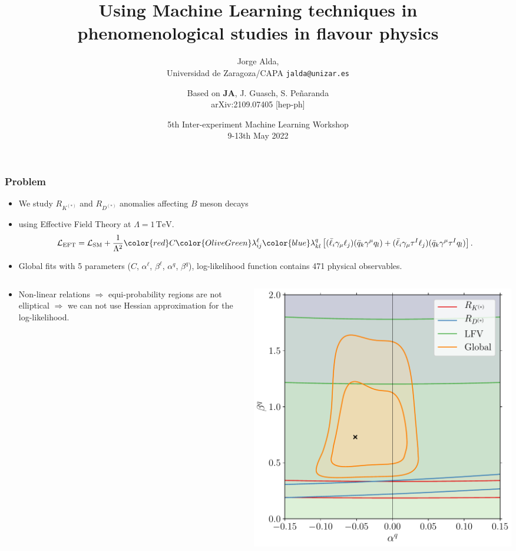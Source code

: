 \documentclass[mathserif, 10pt, dvipsnames]{beamer}
\title[Using ML techniques in phenomenological studies in flavour physics]{Using Machine Learning techniques in\\ phenomenological studies in flavour physics}
\subtitle{Jorge Alda,\\ Universidad de Zaragoza/CAPA \hspace{4em} \texttt{jalda@unizar.es} }
\author[Jorge Alda]{Based on \textbf{JA}, J. Guasch, S. Peñaranda \\
arXiv:2109.07405 [hep-ph]}
\date[CERN Workshop]{5th Inter-experiment Machine Learning Workshop\\ 9-13th May 2022}
\begin{document}
\begin{frame}

\titlepage

\end{frame}

\begin{frame}\frametitle{Problem}
\begin{itemize}
\item We study $R_{K^{(*)}}$ and $R_{D^{(*)}}$ anomalies affecting $B$ meson decays
    \item using Effective Field Theory at $\Lambda = 1\,\mathrm{TeV}$.
$$\mathcal{L}_\mathrm{EFT} = \mathcal{L}_\mathrm{SM} + \frac{1}{\Lambda^2} {\color{red}C} {\color{OliveGreen}\lambda^\ell_{ij}} {\color{blue}\lambda^q_{kl}}\left[ (\bar{\ell}_i \gamma_\mu \ell_j)(\bar{q}_k \gamma^\mu  q_l) + (\bar{\ell}_i \gamma_\mu \tau^I \ell_j)(\bar{q}_k \gamma^\mu \tau^I q_l) \right].$$
\item Global fits with 5 parameters ({\color{red}$C$}, {\color{OliveGreen}$\alpha^\ell$}, {\color{OliveGreen}$\beta^\ell$}, {\color{blue}$\alpha^q$}, {\color{blue}$\beta^q$}), log-likelihood function contains 471 physical observables.
\end{itemize}
\begin{columns}[onlytextwidth]
    \begin{column}{0.7\textwidth}
        \begin{itemize}
            \item Non-linear relations $\Longrightarrow$ equi-probability regions are not elliptical $\Longrightarrow$ we can not use Hessian approximation for the log-likelihood.
        \end{itemize}
    \end{column}
    \begin{column}{0.25\textwidth}
        \includegraphics[width=\textwidth]{figures/alphabeta_q.pdf}
    \end{column}
\end{columns}
\end{frame}
\end{document}
